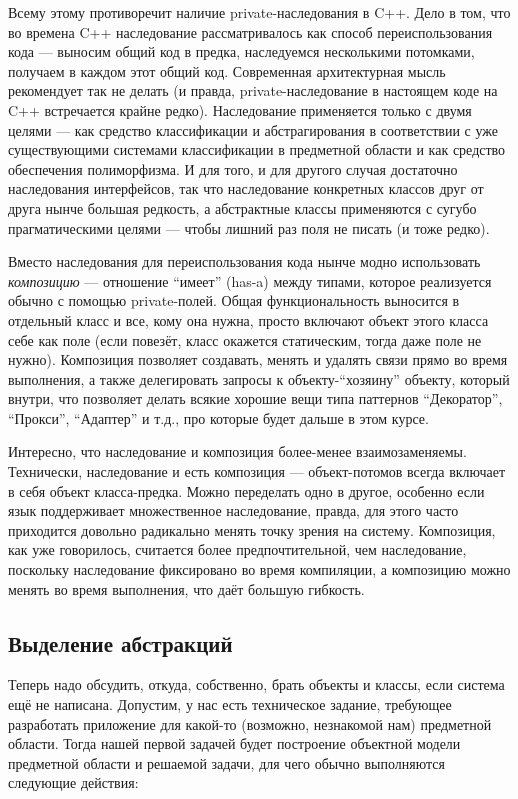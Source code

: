 \documentclass{../../text-style}
\begin{document}
Всему этому противоречит наличие private-наследования в C++. Дело в том, что во времена C++ наследование рассматривалось как способ переиспользования кода --- выносим общий код в предка, наследуемся несколькими потомками, получаем в каждом этот общий код. Современная архитектурная мысль рекомендует так не делать (и правда, private-наследование в настоящем коде на C++ встречается крайне редко). Наследование применяется только с двумя целями --- как средство классификации и абстрагирования в соответствии с уже существующими системами классификации в предметной области и как средство обеспечения полиморфизма. И для того, и для другого случая достаточно наследования интерфейсов, так что наследование конкретных классов друг от друга нынче большая редкость, а абстрактные классы применяются с сугубо прагматическими целями --- чтобы лишний раз поля не писать (и тоже редко).

Вместо наследования для переиспользования кода нынче модно использовать \textit{композицию} --- отношение ``имеет'' (has-a) между типами, которое реализуется обычно с помощью private-полей. Общая функциональность выносится в отдельный класс и все, кому она нужна, просто включают объект этого класса себе как поле (если повезёт, класс окажется статическим, тогда даже поле не нужно). Композиция позволяет создавать, менять и удалять связи прямо во время выполнения, а также делегировать запросы к объекту-``хозяину'' объекту, который внутри, что позволяет делать всякие хорошие вещи типа паттернов ``Декоратор'', ``Прокси'', ``Адаптер'' и т.д., про которые будет дальше в этом курсе.

Интересно, что наследование и композиция более-менее взаимозаменяемы. Технически, наследование и есть композиция --- объект-потомов всегда включает в себя объект класса-предка. Можно переделать одно в другое, особенно если язык поддерживает множественное наследование, правда, для этого часто приходится довольно радикально менять точку зрения на систему. Композиция, как уже говорилось, считается более предпочтительной, чем наследование, поскольку наследование фиксировано во время компиляции, а композицию можно менять во время выполнения, что даёт большую гибкость.

\subsection{Выделение абстракций}

Теперь надо обсудить, откуда, собственно, брать объекты и классы, если система ещё не написана. Допустим, у нас есть техническое задание, требующее разработать приложение для какой-то (возможно, незнакомой нам) предметной области. Тогда нашей первой задачей будет построение объектной модели предметной области и решаемой задачи, для чего обычно выполняются следующие действия:
\end{document}
